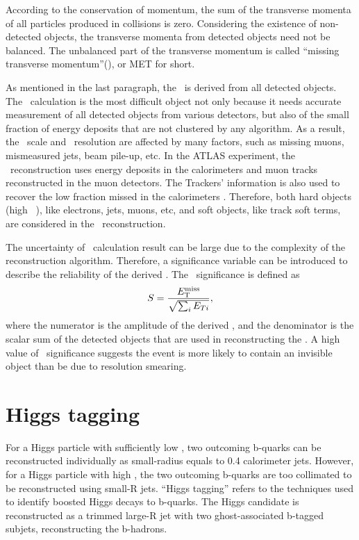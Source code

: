\par According to the conservation of momentum, the sum of the transverse momenta of all particles produced in collisions is zero. Considering the existence of non-detected objects, the transverse momenta from detected objects need not be balanced. The unbalanced part of the transverse momentum is called ``missing transverse momentum''(\met), or MET for short.

\par As mentioned in the last paragraph, the \met~is derived from all detected objects. The \met~calculation is the most difficult object not only because it needs accurate measurement of all detected objects from various detectors, but also of the small fraction of energy deposits that are not clustered by any algorithm. As a result, the \met~scale and \met~resolution are affected by many factors, such as missing muons, mismeasured jets, beam pile-up, etc. In the ATLAS experiment, the \met~reconstruction uses energy deposits in the calorimeters and muon tracks reconstructed in the muon detectors. The Trackers' information is also used to recover the low \pt fraction missed in the calorimeters \cite{ATLAS-CONF-2013-082}. Therefore, both hard objects (high \pt~), like electrons, jets, muons, etc, and soft objects, like track soft terms, are considered in the \met~reconstruction.

\par The uncertainty of \met~calculation result can be large due to the complexity of the reconstruction algorithm. Therefore, a significance variable can be introduced to describe the reliability of the derived \met. The \met~significance is defined as
$$ S=\frac{E_{\mathrm{T}}^{\mathrm{miss}}}{\sqrt{\sum_{i}E_{Ti}}}, $$
where the numerator is the amplitude of the derived \met, and the denominator is the scalar sum of the detected objects that are used in reconstructing the \met. A high value of \met~significance suggests the event is more likely to contain an invisible object than be due to resolution smearing.

\section{Higgs tagging}
\label{sec:higgs}

\par For a Higgs particle with sufficiently low \pt, two outcoming b-quarks can be reconstructed individually as small-radius equals to 0.4 calorimeter jets. However, for a Higgs particle with high \pt, 
the two outcoming b-quarks are too collimated to be reconstructed using small-R jets.
``Higgs tagging'' refers to the techniques used to identify boosted Higgs decays to b-quarks. The Higgs candidate is reconstructed as a trimmed large-R jet 
with two ghost-associated b-tagged subjets, reconstructing the b-hadrons.


